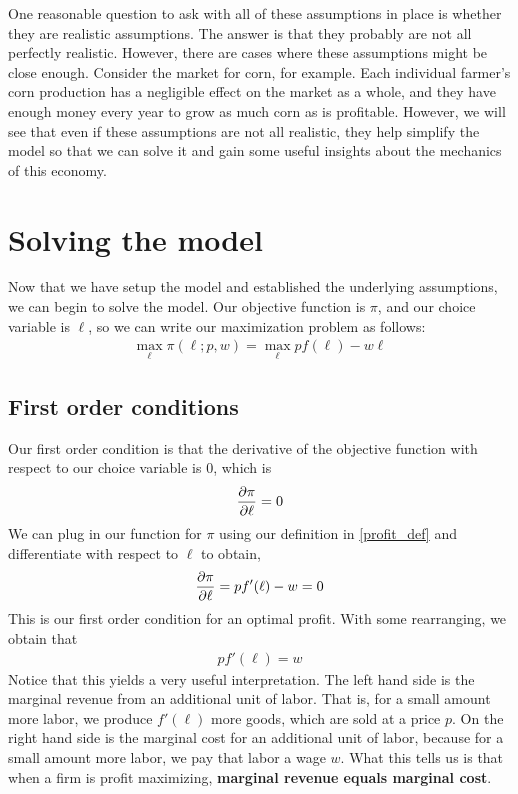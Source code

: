 One reasonable question to ask with all of these assumptions in place is whether they are realistic assumptions. The answer is that they probably are not all perfectly realistic. However, there are cases where these assumptions might be close enough. Consider the market for corn, for example. Each individual farmer's corn production has a negligible effect on the market as a whole, and they have enough money every year to grow as much corn as is profitable. However, we will see that even if these assumptions are not all realistic, they help simplify the model so that we can solve it and gain some useful insights about the mechanics of this economy. 

\section{Solving the model}
Now that we have setup the model and established the underlying assumptions, we can begin to solve the model. Our objective function is $\pi$, and our choice variable is $\ell$, so we can write our maximization problem as follows:
\begin{align}
    \max_{\ell} \pi(\ell; p, w) = \max_{\ell} p f(\ell) - w \ell
\end{align}

\subsection{First order conditions}
Our first order condition is that the derivative of the objective function with respect to our choice variable is 0, which is
\begin{align}
    \frac{\partial \pi}{\partial \ell} = 0 \label{profit_foc}
\end{align}
We can plug in our function for $\pi$ using our definition in \ref{profit_def} and differentiate with respect to $\ell$ to obtain,
\begin{align}
    \frac{\partial \pi}{\partial \ell} = p f'(\ell) - w = 0
\end{align}
This is our first order condition for an optimal profit. With some rearranging, we obtain that
\begin{align}
    p f'(\ell) = w
\end{align}
Notice that this yields a very useful interpretation. The left hand side is the marginal revenue from an additional unit of labor. That is, for a small amount more labor, we produce $f'(\ell)$ more goods, which are sold at a price $p$. On the right hand side is the marginal cost for an additional unit of labor, because for a small amount more labor, we pay that labor a wage $w$. What this tells us is that when a firm is profit maximizing, \textbf{marginal revenue equals marginal cost}. 

